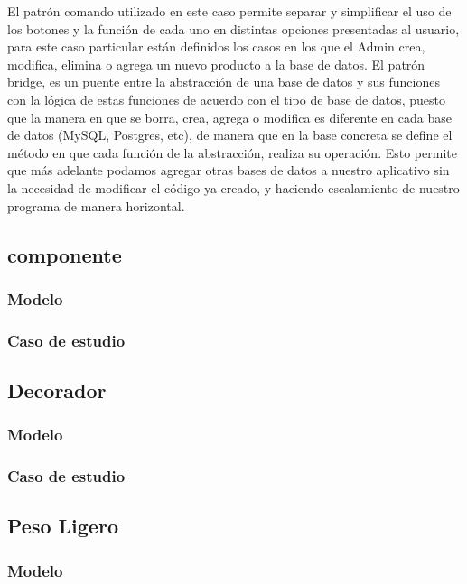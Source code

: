 El patrón comando utilizado en este caso permite separar y simplificar el uso de los botones y la función de cada uno en distintas opciones presentadas al usuario, para este caso particular están definidos los casos en los que el Admin crea, modifica, elimina o agrega un nuevo producto a la base de datos.
El patrón bridge, es un puente entre la abstracción de una base de datos y sus funciones con la lógica de estas funciones de acuerdo con el tipo de base de datos, puesto que la manera en que se borra, crea, agrega o modifica es diferente en cada base de datos (MySQL, Postgres, etc), de manera que en la base concreta se define el método en que cada función de la abstracción, realiza su operación. Esto permite que más adelante podamos agregar otras bases de datos a nuestro aplicativo sin la necesidad de modificar el código ya creado, y haciendo escalamiento de nuestro programa de manera horizontal.

\newpage

\subsection{componente}
\subsubsection{Modelo}
\newpage
\subsubsection{Caso de estudio}
\newpage

\subsection{Decorador}
\subsubsection{Modelo}
\newpage
\subsubsection{Caso de estudio}
\newpage

\subsection{Peso Ligero}
\subsubsection{Modelo}
\newpage
